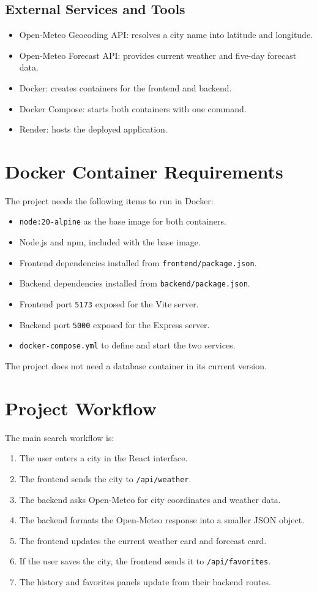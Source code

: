 \documentclass[11pt]{article}
\begin{document}
\subsection{External Services and Tools}
\begin{itemize}
\item Open-Meteo Geocoding API: resolves a city name into latitude and longitude.
\item Open-Meteo Forecast API: provides current weather and five-day forecast data.
\item Docker: creates containers for the frontend and backend.
\item Docker Compose: starts both containers with one command.
\item Render: hosts the deployed application.
\end{itemize}

\section{Docker Container Requirements}
The project needs the following items to run in Docker:

\begin{itemize}
\item \texttt{node:20-alpine} as the base image for both containers.
\item Node.js and npm, included with the base image.
\item Frontend dependencies installed from \texttt{frontend/package.json}.
\item Backend dependencies installed from \texttt{backend/package.json}.
\item Frontend port \texttt{5173} exposed for the Vite server.
\item Backend port \texttt{5000} exposed for the Express server.
\item \texttt{docker-compose.yml} to define and start the two services.
\end{itemize}

The project does not need a database container in its current version.

\section{Project Workflow}
The main search workflow is:

\begin{enumerate}
\item The user enters a city in the React interface.
\item The frontend sends the city to \texttt{/api/weather}.
\item The backend asks Open-Meteo for city coordinates and weather data.
\item The backend formats the Open-Meteo response into a smaller JSON object.
\item The frontend updates the current weather card and forecast card.
\item If the user saves the city, the frontend sends it to \texttt{/api/favorites}.
\item The history and favorites panels update from their backend routes.
\end{enumerate}
\end{document}
